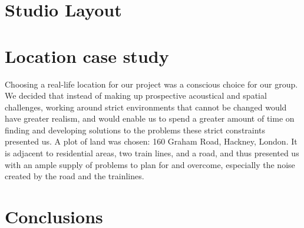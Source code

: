 \documentclass[10pt, twocolumn]{article}
\begin{document}
    \section{Studio Layout}

    \section{Location case study}
        Choosing a real-life location for our project was a conscious choice for our group.
        We decided that instead of making up prospective acoustical and spatial challenges, working around strict environments that cannot be changed would have greater realism, and would enable us to spend a greater amount of time on finding and developing solutions to the problems these strict constraints presented us.
        A plot of land was chosen: 160 Graham Road, Hackney, London.
        It is adjacent to residential areas, two train lines, and a road, and thus presented us with an ample supply of problems to plan for and overcome, especially the noise created by the road and the trainlines.


    \section{Conclusions}

    
    
\end{document}
